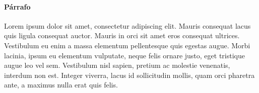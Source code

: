 \documentclass[letterpaper]{pt-article}
\begin{document}
\paragraph{Párrafo}
Lorem ipsum dolor sit amet, consectetur adipiscing elit. Mauris consequat lacus quis ligula consequat auctor. Mauris in orci sit amet eros consequat ultrices. Vestibulum eu enim a massa elementum pellentesque quis egestas augue. Morbi lacinia, ipsum eu elementum vulputate, neque felis ornare justo, eget tristique augue leo vel sem. Vestibulum nisl sapien, pretium ac molestie venenatis, interdum non est. Integer viverra, lacus id sollicitudin mollis, quam orci pharetra ante, a maximus nulla erat quis felis.
\end{document}
